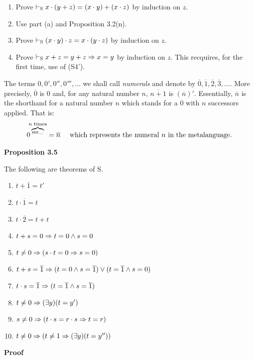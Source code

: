 \begin{enumerate} [label = \alph*.]
    \item Prove $\vdash_\text{S} x \cdot (y+z)=(x \cdot y) + (x \cdot z)$ by induction on $z$.
    \item Use part (a) and Proposition 3.2(n).
    \item Prove $\vdash_\text{S} (x \cdot y) \cdot z= x \cdot (y \cdot z)$ by induction on $z$.
    \item Prove $\vdash_\text{S} x + z = y + z \Rightarrow x = y$ by induction on $z$. This recquires, for the first time, use of (S4').
\end{enumerate}

The terms $0, 0', 0'', 0''', \dots$ we shall call \textit{numerals} and denote by $\overline{0}, \overline{1}, \overline{2}, \overline{3}, \dots$. More precisely, $\overline{0}$ is $0$ and, for any natural number $n$, $\overline{n+1}$ is $(\overline{n})'$. Essentially, $\overline{n}$ is the shorthand for a natural number $n$ which stands for a $0$ with $n$ successors applied. That is:
\[0\hspace{-.4em}\overbrace{''''^{\dots}}^{n \text{ times}} = \overline{n}\quad  \text{ which represents the numeral $n$ in the metalanguage.}\]

\textbf{Proposition 3.5}

The following are theorems of S.

\begin{enumerate} [label = \alph*.]
    \item $t+ \overline{1}= t'$
    \item $t \cdot \overline{1} = t$
    \item $t \cdot \overline{2} = t + t$
    \item $t+s=0 \Rightarrow t = 0 \land s = 0$
    \item $t \not = 0 \Rightarrow (s \cdot t = 0 \Rightarrow s = 0)$
    \item $t + s = \overline{1} \Rightarrow (t = 0 \land s = \overline{1}) \lor (t = \overline{1} \land s = 0)$ 
    \item $t \cdot s = \overline{1} \Rightarrow (t = \overline{1} \land s = \overline{1})$
    \item $t \not = 0 \Rightarrow (\exists y)(t = y')$
    \item $s \not = 0 \Rightarrow (t \cdot s = r \cdot s \Rightarrow t = r)$
    \item $t \not = 0 \Rightarrow (t \not = 1 \Rightarrow (\exists y)(t = y''))$ 
\end{enumerate}

\textbf{Proof}


